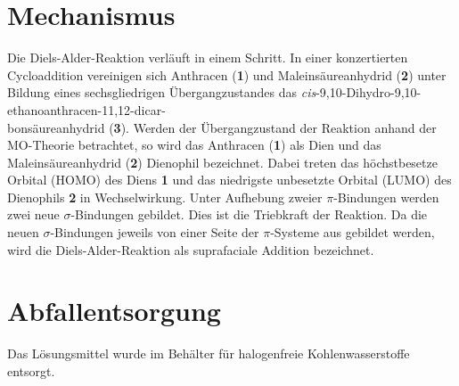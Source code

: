 \documentclass[12pt]{article}
\begin{document}
\begin{onehalfspace}
\begin{experimental}[format=\bfseries,delta=(ppm),list=true,use-equal,pos-number = side]
\begin{minipage}[t][][b]{0.4\textwidth}
\end{minipage}
\end{experimental}
\section{Mechanismus\cite{organikum}\cite{sig}\cite{art}}
Die Diels-Alder-Reaktion verläuft in einem Schritt. In einer konzertierten Cycloaddition vereinigen sich Anthracen (\textbf{1}) und Maleinsäureanhydrid (\textbf{2}) unter Bildung eines sechsgliedrigen Übergangzustandes das \textit{cis}-9,10-Dihydro-9,10-ethanoanthracen-11,12-dicar-\\bonsäureanhydrid (\textbf{3}). Werden der Übergangzustand der Reaktion anhand der MO-Theorie betrachtet, so wird das Anthracen (\textbf{1}) als Dien und das Maleinsäureanhydrid (\textbf{2}) Dienophil bezeichnet. Dabei treten das höchstbesetze Orbital (HOMO) des Diens \textbf{1} und das niedrigste unbesetzte Orbital (LUMO) des Dienophils \textbf{2} in Wechselwirkung. Unter Aufhebung zweier $\pi$-Bindungen werden zwei neue $\sigma$-Bindungen gebildet. Dies ist die Triebkraft der Reaktion. Da die neuen $\sigma$-Bindungen jeweils von einer Seite der $\pi$-Systeme aus gebildet werden, wird die Diels-Alder-Reaktion als suprafaciale Addition bezeichnet. 

\section{Abfallentsorgung}
Das Lösungsmittel wurde im Behälter für halogenfreie Kohlenwasserstoffe entsorgt.

\end{onehalfspace}
\end{document}

